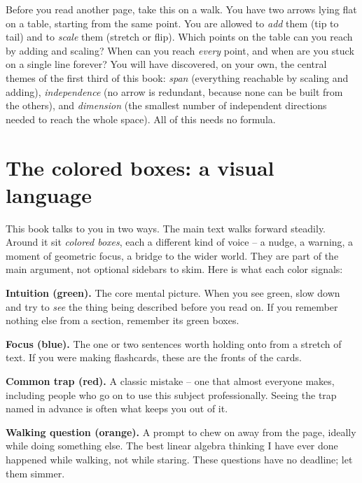 \begin{walkbox}
Before you read another page, take this on a walk. You have two arrows lying flat
on a table, starting from the same point. You are allowed to \emph{add} them
(tip to tail) and to \emph{scale} them (stretch or flip). Which points on the
table can you reach by adding and scaling? When can you reach \emph{every} point,
and when are you stuck on a single line forever? You will have discovered,
on your own, the central themes of the first third of this book: \emph{span}
(everything reachable by scaling and adding), \emph{independence}
(no arrow is redundant, because none can be built from the others), and \emph{dimension}
(the smallest number of independent directions needed to reach the whole space).
All of this needs no formula.
\end{walkbox}

\section*{The colored boxes: a visual language}

This book talks to you in two ways. The main text walks forward steadily.
Around it sit \emph{colored boxes}, each a different kind of voice -- a nudge, a
warning, a moment of geometric focus, a bridge to the wider world. They are part
of the main argument, not optional sidebars to skim. Here is what each color
signals:

\begin{intuitionbox}
\textbf{Intuition (green).} The core mental picture. When you see green, slow
down and try to \emph{see} the thing being described before you read on. If you
remember nothing else from a section, remember its green boxes.
\end{intuitionbox}

\begin{focusbox}
\textbf{Focus (blue).} The one or two sentences worth holding onto from a stretch
of text. If you were making flashcards, these are the fronts of the cards.
\end{focusbox}

\begin{trapbox}
\textbf{Common trap (red).} A classic mistake -- one that almost everyone makes,
including people who go on to use this subject professionally. Seeing the trap
named in advance is often what keeps you out of it.
\end{trapbox}

\begin{walkbox}
\textbf{Walking question (orange).} A prompt to chew on away from the page,
ideally while doing something else. The best linear algebra thinking I have ever
done happened while walking, not while staring. These questions have no
deadline; let them simmer.
\end{walkbox}

